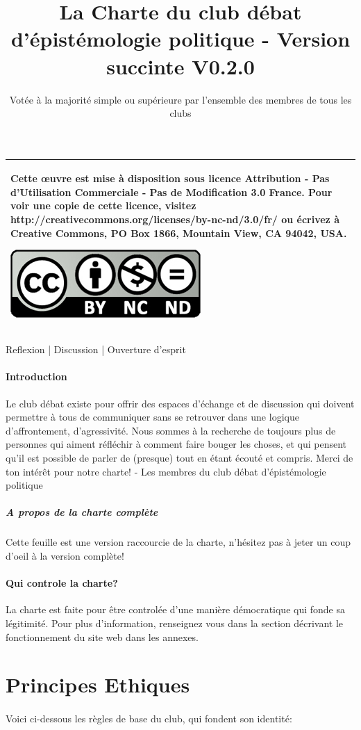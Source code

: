 \documentclass[a4paper,11pt]{article}
\title{\Huge{La Charte du club débat d'épistémologie politique - Version succinte} \LARGE{V0.2.0}}
\author{Votée à la majorité simple ou supérieure par l'ensemble des membres de tous les clubs}
\begin{document}
\begin{tabular}{|p{}|}
 \hline
 Cette œuvre est mise à disposition sous licence Attribution - Pas d’Utilisation Commerciale - Pas de Modification 3.0 France. Pour voir une copie de cette licence, visitez http://creativecommons.org/licenses/by-nc-nd/3.0/fr/ ou écrivez à Creative Commons, PO Box 1866, Mountain View, CA 94042, USA.
 \begin{center}
 \includegraphics[scale=1]{cc.jpg}
 \end{center}\\
 \hline
\end{tabular}

Reflexion | Discussion | Ouverture d'esprit

\paragraph{Introduction}
Le club débat existe pour offrir des espaces d'échange et de discussion qui doivent permettre à tous de communiquer sans se retrouver dans une logique d'affrontement, d'agressivité. Nous sommes à la recherche de toujours plus de personnes qui aiment réfléchir à comment faire bouger les choses, et qui pensent qu'il est possible de parler de (presque) tout en étant écouté et compris.  Merci de ton intérêt pour notre charte! - Les membres du club débat d'épistémologie politique
\subparagraph{A propos de la charte complète}
Cette feuille est une version raccourcie de la charte, n'hésitez pas à jeter un coup d'oeil à la version complète!

\paragraph{Qui controle la charte?}
La charte est faite pour être controlée d'une manière démocratique qui fonde sa légitimité. Pour plus d'information, renseignez vous dans la section décrivant le fonctionnement du site web dans les annexes.
  
\section{Principes Ethiques}
\paragraph{} 
Voici ci-dessous les règles de base du club, qui fondent son identité:
\end{document}
